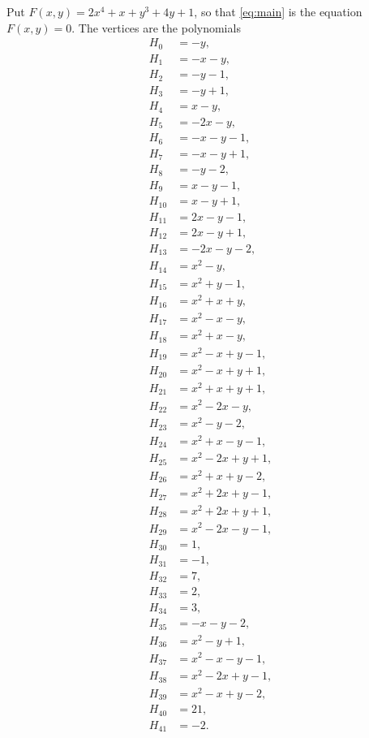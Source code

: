 \documentclass[11pt]{article}
\begin{document}
Put $F(x,y)=2x^{4}+x+y^{3}+4y+1$, so that \eqref{eq:main} is the equation $F(x,y)=0$. The vertices are the polynomials
\begin{align*}
H_{0}&=-y,\\
H_{1}&=-x-y,\\
H_{2}&=-y-1,\\
H_{3}&=-y+1,\\
H_{4}&=x-y,\\
H_{5}&=-2x-y,\\
H_{6}&=-x-y-1,\\
H_{7}&=-x-y+1,\\
H_{8}&=-y-2,\\
H_{9}&=x-y-1,\\
H_{10}&=x-y+1,\\
H_{11}&=2x-y-1,\\
H_{12}&=2x-y+1,\\
H_{13}&=-2x-y-2,\\
H_{14}&=x^{2}-y,\\
H_{15}&=x^{2}+y-1,\\
H_{16}&=x^{2}+x+y,\\
H_{17}&=x^{2}-x-y,\\
H_{18}&=x^{2}+x-y,\\
H_{19}&=x^{2}-x+y-1,\\
H_{20}&=x^{2}-x+y+1,\\
H_{21}&=x^{2}+x+y+1,\\
H_{22}&=x^{2}-2x-y,\\
H_{23}&=x^{2}-y-2,\\
H_{24}&=x^{2}+x-y-1,\\
H_{25}&=x^{2}-2x+y+1,\\
H_{26}&=x^{2}+x+y-2,\\
H_{27}&=x^{2}+2x+y-1,\\
H_{28}&=x^{2}+2x+y+1,\\
H_{29}&=x^{2}-2x-y-1,\\
H_{30}&=1,\\
H_{31}&=-1,\\
H_{32}&=7,\\
H_{33}&=2,\\
H_{34}&=3,\\
H_{35}&=-x-y-2,\\
H_{36}&=x^{2}-y+1,\\
H_{37}&=x^{2}-x-y-1,\\
H_{38}&=x^{2}-2x+y-1,\\
H_{39}&=x^{2}-x+y-2,\\
H_{40}&=21,\\
H_{41}&=-2.
\end{align*}
\end{document}
